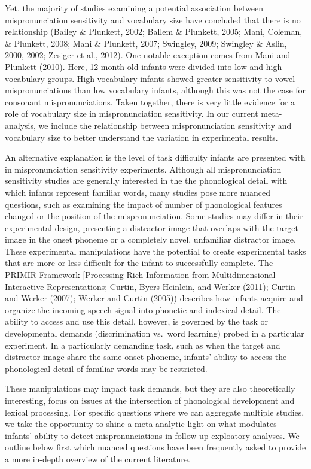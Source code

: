 \documentclass[man]{apa6}
\begin{document}
Yet, the majority of studies examining a potential association between mispronunciation sensitivity and vocabulary size have concluded that there is no relationship (Bailey \& Plunkett, 2002; Ballem \& Plunkett, 2005; Mani, Coleman, \& Plunkett, 2008; Mani \& Plunkett, 2007; Swingley, 2009; Swingley \& Aslin, 2000, 2002; Zesiger et al., 2012). One notable exception comes from Mani and Plunkett (2010). Here, 12-month-old infants were divided into low and high vocabulary groups. High vocabulary infants showed greater sensitivity to vowel mispronunciations than low vocabulary infants, although this was not the case for consonant mispronunciations. Taken together, there is very little evidence for a role of vocabulary size in mispronunciation sensitivity. In our current meta-analysis, we include the relationship between mispronunciation sensitivity and vocabulary size to better understand the variation in experimental results.

An alternative explanation is the level of task difficulty infants are presented with in mispronunciation sensitivity experiments. Although all mispronunciation sensitivity studies are generally interested in the the phonological detail with which infants represent familiar words, many studies pose more nuanced questions, such as examining the impact of number of phonological features changed or the position of the mispronunciation. Some studies may differ in their experimental design, presenting a distractor image that overlaps with the target image in the onset phoneme or a completely novel, unfamiliar distractor image. These experimental manipulations have the potential to create experimental tasks that are more or less difficult for the infant to successfully complete. The PRIMIR Framework {[}Processing Rich Information from Multidimensional Interactive Representations; Curtin, Byers-Heinlein, and Werker (2011); Curtin and Werker (2007); Werker and Curtin (2005)) describes how infants acquire and organize the incoming speech signal into phonetic and indexical detail. The ability to access and use this detail, however, is governed by the task or developmental demands (discrimination vs.~word learning) probed in a particular experiment. In a particularly demanding task, such as when the target and distractor image share the same onset phoneme, infants' ability to access the phonological detail of familiar words may be restricted.

These manipulations may impact task demands, but they are also theoretically interesting, focus on issues at the intersection of phonological development and lexical processing. For specific questions where we can aggregate multiple studies, we take the opportunity to shine a meta-analytic light on what modulates infants' ability to detect mispronunciations in follow-up exploatory analyses. We outline below first which nuanced questions have been frequently asked to provide a more in-depth overview of the current literature.
\end{document}
